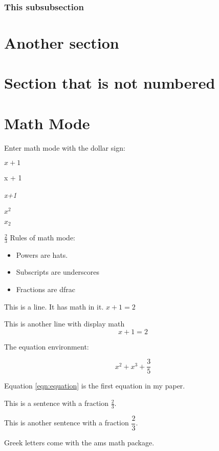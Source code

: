 \documentclass[12pt]{article} %
\begin{document}
\lipsum 

\subsubsection{This subsubsection}

\lipsum 

\section{Another section}

\lipsum[2]

\section*{Section that is not numbered}

\section{Math Mode}

Enter math mode with the dollar sign:

$x + 1$

x + 1

\textit{x+1}

$x^2$

$x_2$

$\frac{2}{3}$
Rules of math mode:

\begin{itemize}
    \item Powers are hats.
    \item Subscripts are underscores
    \item Fractions are dfrac
\end{itemize}

This is a line. It has math in it. $x + 1 = 2$

This is another line with display math $$x + 1 = 2$$

The equation environment:

\begin{equation}
    x^2 + x^3 + \frac{3}{5}
    \label{eqn:equation}
\end{equation}

Equation \ref{eqn:equation} is the first equation in my paper. 

This is a sentence with a fraction $\frac{2}{3}$. 

This is another sentence with a fraction $\dfrac{2}{3}$. 

Greek letters come with the ams math package. 
\end{document}
